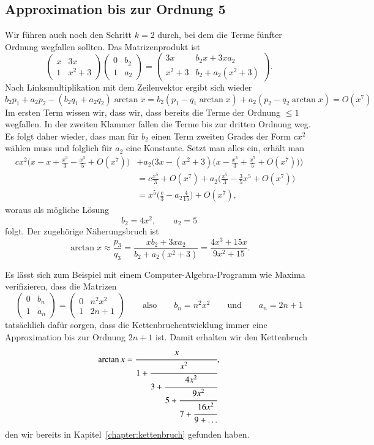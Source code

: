 \begin{refsection}
\subsection{Approximation bis zur Ordnung 5}
Wir führen auch noch den Schritt $k=2$ durch, bei dem die Terme fünfter
Ordnung wegfallen sollten.
Das Matrizenprodukt ist
\[
\begin{pmatrix}
x&3x\\
1&x^2+3
\end{pmatrix}
\begin{pmatrix}
0&b_2\\
1&a_2
\end{pmatrix}
=
\begin{pmatrix}
3x    & b_2x + 3xa_2 \\
x^2+3 & b_2 + a_2(x^2+3)
\end{pmatrix}.
\]
Nach Linksmultiplikation mit dem Zeilenvektor ergibt sich wieder
\[
b_2p_1 + a_2p_2 - (b_2q_1+a_2q_2)
\arctan x
=
b_2(p_1-q_1 \arctan x)
+ a_2(p_2 - q_2\arctan x)
=
O(x^7)
\]
Im ersten Term wissen wir, dass wir, dass bereits die Terme der
Ordnung $\le 1$ wegfallen.
In der zweiten Klammer fallen die Terme bis zur dritten Ordnung weg.
Es folgt daher wieder, dass man für $b_2$ einen Term zweiten Grades
der Form $cx^2$ wählen muss und folglich für $a_2$ eine Konstante.
Setzt man alles ein, erhält man
\begin{align*}
cx^2\biggl(x- x+\frac{x^3}3-\frac{x^5}5+O(x^7)\biggr)
&+
a_2\biggl(3x -(x^2+3)\biggl(x-\frac{x^3}3+\frac{x^5}5+O(x^7)\biggr)\biggr)
\\
&=
c\frac{x^5}{3}
+O(x^7)
+a_2
\biggl(\frac{x^5}{3}-\frac{3}{5}x^5+O(x^7)\biggr)
\\
&=x^5\biggl(\frac{c}3-a_2\frac{4}{15}\biggr) + O(x^7),
\end{align*}
woraus als mögliche Lösung
\[
b_2=4x^2,\qquad
a_2=5
\]
folgt.
Der zugehörige Näherungsbruch ist
\[
\arctan x
\approx
\frac{p_3}{q_3}
=
\frac{xb_2+3xa_2}{b_2+a_2(x^2+3)}
=
\frac{4x^3+15x}{9x^2+15}.
\]

Es lässt sich zum Beispiel mit einem Computer-Algebra-Programm wie
Maxima verifizieren, dass die Matrizen
\begin{equation}
\begin{pmatrix}
0&b_n\\
1&a_n
\end{pmatrix}
=
\begin{pmatrix}
0&n^2x^2\\
1&2n+1
\end{pmatrix}
\qquad\text{also}\qquad
b_n=n^2x^2\qquad\text{und}\qquad a_n=2n+1
\label{arctan:increment}
\end{equation}
tatsächlich dafür sorgen, dass die Kettenbruchentwicklung 
immer eine Approximation bis zur Ordnung $2n+1$ ist.
Damit erhalten wir den Kettenbruch
\[
\arctan x
=
\cfrac{x}{
1+\cfrac{x^2}{
3+\cfrac{4x^2}{
5+\cfrac{9x^2}{
7+\cfrac{16x^2}{
9+\dots
}}}}},
\]
den wir bereits in Kapitel~\ref{chapter:kettenbruch} gefunden haben.


\end{refsection}
